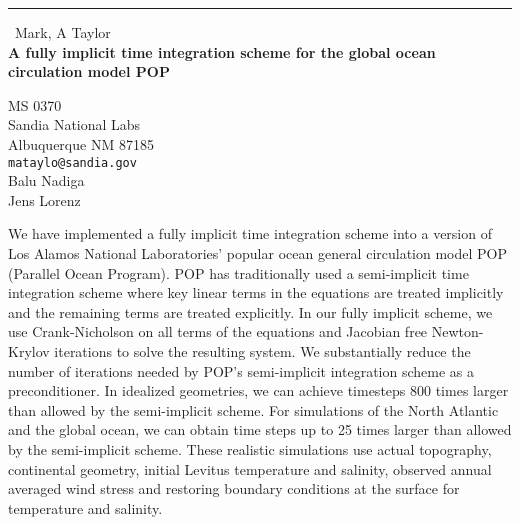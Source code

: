 \documentclass{report}
\begin{document}
\begin{center}
\rule{6in}{1pt} \
{\large Mark, A Taylor \\
{\bf A fully implicit time integration scheme for the global ocean circulation model POP}}

MS 0370 \\ Sandia National Labs \\ Albuquerque NM 87185
\\
{\tt mataylo@sandia.gov}\\
Balu Nadiga\\
Jens Lorenz\end{center}

We have implemented a fully implicit time integration scheme into a
version of Los Alamos National Laboratories' popular ocean general
circulation model POP (Parallel Ocean Program). POP has traditionally
used a semi-implicit time integration scheme where key linear terms in
the equations are treated implicitly and the remaining terms are treated
explicitly. In our fully implicit scheme, we use Crank-Nicholson on all
terms of the equations and Jacobian free Newton-Krylov iterations to
solve the resulting system. We substantially reduce the number of
iterations needed by POP's semi-implicit integration scheme as a
preconditioner. In idealized geometries, we can achieve timesteps 800
times larger than allowed by the semi-implicit scheme. For simulations of
the North Atlantic and the global ocean, we can obtain time steps up to
25 times larger than allowed by the semi-implicit scheme. These realistic
simulations use actual topography, continental geometry, initial Levitus
temperature and salinity, observed annual averaged wind stress and
restoring boundary conditions at the surface for temperature and
salinity.
\end{document}
